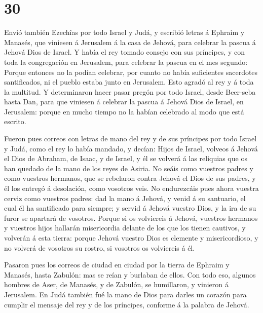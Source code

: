\hypertarget{section-29}{%
\section{30}\label{section-29}}

 Envió también Ezechîas por todo Israel y Judá, y escribió
letras á Ephraim y Manasés, que viniesen á Jerusalem á la casa de
Jehová, para celebrar la pascua á Jehová Dios de Israel. 
Y había el rey tomado consejo con sus príncipes, y con toda la
congregación en Jerusalem, para celebrar la pascua en el mes segundo:
 Porque entonces no la podían celebrar, por cuanto no
había suficientes sacerdotes santificados, ni el pueblo estaba junto en
Jerusalem.  Esto agradó al rey y á toda la multitud.
 Y determinaron hacer pasar pregón por todo Israel, desde
Beer-seba hasta Dan, para que viniesen á celebrar la pascua á Jehová
Dios de Israel, en Jerusalem: porque en mucho tiempo no la habían
celebrado al modo que está escrito.

 Fueron pues correos con letras de mano del rey y de sus
príncipes por todo Israel y Judá, como el rey lo había mandado, y
decían: Hijos de Israel, volveos á Jehová el Dios de Abraham, de Isaac,
y de Israel, y él se volverá á las reliquias que os han quedado de la
mano de los reyes de Asiria.  No seáis como vuestros
padres y como vuestros hermanos, que se rebelaron contra Jehová el Dios
de sus padres, y él los entregó á desolación, como vosotros veis.
 No endurezcáis pues ahora vuestra cerviz como vuestros
padres: dad la mano á Jehová, y venid á su santuario, el cual él ha
santificado para siempre; y servid á Jehová vuestro Dios, y la ira de su
furor se apartará de vosotros.  Porque si os volviereis á
Jehová, vuestros hermanos y vuestros hijos hallarán misericordia delante
de los que los tienen cautivos, y volverán á esta tierra: porque Jehová
vuestro Dios es clemente y misericordioso, y no volverá de vosotros su
rostro, si vosotros os volviereis á él.

 Pasaron pues los correos de ciudad en ciudad por la
tierra de Ephraim y Manasés, hasta Zabulón: mas se reían y burlaban de
ellos.  Con todo eso, algunos hombres de Aser, de
Manasés, y de Zabulón, se humillaron, y vinieron á Jerusalem.
 En Judá también fué la mano de Dios para darles un
corazón para cumplir el mensaje del rey y de los príncipes, conforme á
la palabra de Jehová.

